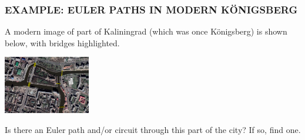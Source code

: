 \documentclass[8pt]{beamer}
\newcommand{\extitle}[1]{\frametitle{\fontfamily{fvs}\selectfont \small\color{black!70!blue!80!cyan}\uppercase{\bfseries Example: #1}}}
\def\solblank{\begin{tcolorbox}[colframe=black!50!blue!50!cyan,
colback=white,
bottomrule=0mm,
rightrule=0mm,
sharp corners=all] 
\vspace{6in}
\text{}
\end{tcolorbox}}
\begin{document}
\begin{frame}
\extitle{Euler Paths in Modern K\"onigsberg}
A modern image of part of Kaliningrad (which was once K\"onigsberg) is shown below, with bridges highlighted.
\begin{center}
\includegraphics[height=1in]{ModernKonigsberg}
\end{center}
Is there an Euler path and/or circuit through this part of the city?  If so, find one.

\solblank
\end{frame}
\end{document}
